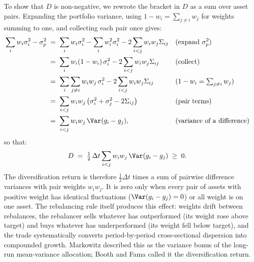 To show that $D$ is non-negative, we rewrote the bracket in $D$ as a
sum over asset pairs. Expanding the portfolio variance, using
$1 - w_i = \sum_{j \ne i} w_j$ for weights summing to one, and
collecting each pair once gives:
\begin{align}
  \sum_i w_i \sigma_i^2 - \sigma_p^2
   &\;=\; \sum_i w_i \sigma_i^2 - \sum_i w_i^2 \sigma_i^2
     - 2 \sum_{i<j} w_i w_j \Sigma_{ij}
     && \text{(expand $\sigma_p^2$)} \notag \\
   &\;=\; \sum_i w_i (1 - w_i)\, \sigma_i^2
     - 2 \sum_{i<j} w_i w_j \Sigma_{ij}
     && \text{(collect)} \notag \\
   &\;=\; \sum_i \sum_{j \ne i} w_i w_j\, \sigma_i^2
     - 2 \sum_{i<j} w_i w_j \Sigma_{ij}
     && \text{($1 - w_i = \textstyle\sum_{j \ne i} w_j$)} \notag \\
   &\;=\; \sum_{i<j} w_i w_j
     \left(\sigma_i^2 + \sigma_j^2 - 2\Sigma_{ij}\right)
     && \text{(pair terms)} \notag \\
   &\;=\; \sum_{i<j} w_i w_j \,\Var(g_i - g_j),
     && \text{(variance of a difference)}
  \label{eq:pair-identity}
\end{align}
so that:
\begin{equation}
  D \;=\; \tfrac{1}{2}\,\Delta t \sum_{i<j} w_i w_j \,\Var(g_i - g_j)
  \;\ge\; 0.
  \label{eq:dr-pairwise}
\end{equation}
The diversification return is therefore $\tfrac{1}{2}\Delta t$ times
a sum of pairwise difference variances with pair weights $w_i w_j$.
It is zero only when every pair of assets with positive weight
has identical fluctuations ($\Var(g_i - g_j) = 0$) or all weight is on one
asset. The rebalancing rule itself produces
this effect: weights drift between rebalances, the rebalancer sells
whatever has outperformed (its weight rose above target) and buys
whatever has underperformed (its weight fell below target), and the
trade systematically converts period-by-period cross-sectional
dispersion into compounded growth. Markowitz
\cite{markowitz1976longRun} described this as the variance bonus of
the long-run mean-variance allocation; Booth and Fama
\cite{boothFama1992} called it the diversification return.

